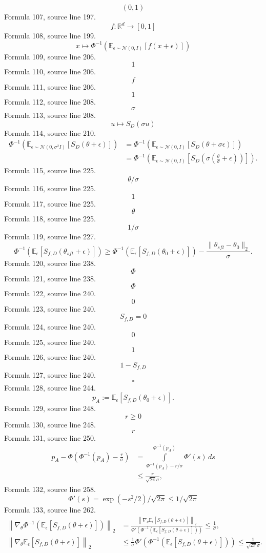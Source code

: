 \documentclass{ctexart}
\begin{document}
\[(0,1)\]
Formula 107, source line 197.
\[f:\mathbb R^d\to[0,1]\]
Formula 108, source line 199.
\[
x\longmapsto
\Phi^{-1}\left(
\mathbb E_{\epsilon\sim\mathcal N(0,I)}[f(x+\epsilon)]
\right)
\]
Formula 109, source line 206.
\[1\]
Formula 110, source line 206.
\[f\]
Formula 111, source line 206.
\[1\]
Formula 112, source line 208.
\[\sigma\]
Formula 113, source line 208.
\[u\mapsto S_D(\sigma u)\]
Formula 114, source line 210.
\[
\begin{aligned}
\Phi^{-1}\left(
\mathbb E_{\epsilon\sim\mathcal N(0,\sigma^2I)}[S_D(\theta+\epsilon)]
\right)
&=\Phi^{-1}\left(
\mathbb E_{\epsilon\sim\mathcal N(0,I)}[S_D(\theta+\sigma\epsilon)]
\right)\\
&=\Phi^{-1}\left(
\mathbb E_{\epsilon\sim\mathcal N(0,I)}
\left[S_D\left(\sigma\left(\frac{\theta}{\sigma}+\epsilon\right)\right)\right]
\right).
\end{aligned}
\]
Formula 115, source line 225.
\[\theta/\sigma\]
Formula 116, source line 225.
\[1\]
Formula 117, source line 225.
\[\theta\]
Formula 118, source line 225.
\[1/\sigma\]
Formula 119, source line 227.
\[
\Phi^{-1}\left(
\mathbb E_\epsilon[S_{f,D}(\theta_{sft}+\epsilon)]
\right)
\geq
\Phi^{-1}\left(
\mathbb E_\epsilon[S_{f,D}(\theta_0+\epsilon)]
\right)
-\frac{\|\theta_{sft}-\theta_0\|_2}{\sigma}.
\]
Formula 120, source line 238.
\[\Phi\]
Formula 121, source line 238.
\[\Phi\]
Formula 122, source line 240.
\[0\]
Formula 123, source line 240.
\[S_{f,D}=0\]
Formula 124, source line 240.
\[0\]
Formula 125, source line 240.
\[1\]
Formula 126, source line 240.
\[1-S_{f,D}\]
Formula 127, source line 240.
\[\square\]
Formula 128, source line 244.
\[
p_A:=\mathbb E_\epsilon[S_{f,D}(\theta_0+\epsilon)].
\]
Formula 129, source line 248.
\[r\geq0\]
Formula 130, source line 248.
\[r\]
Formula 131, source line 250.
\[
\begin{aligned}
p_A-\Phi\left(\Phi^{-1}(p_A)-\frac r\sigma\right)
&=\int\limits_{\Phi^{-1}(p_A)-r/\sigma}^{\Phi^{-1}(p_A)}\Phi'(s)\,ds\\
&\leq\frac{r}{\sqrt{2\pi}\sigma},
\end{aligned}
\]
Formula 132, source line 258.
\[\Phi'(s)=\exp(-s^2/2)/\sqrt{2\pi}\leq1/\sqrt{2\pi}\]
Formula 133, source line 262.
\[
\begin{aligned}
\left\|\nabla_\theta
\Phi^{-1}\left(\mathbb E_\epsilon[S_{f,D}(\theta+\epsilon)]\right)
\right\|_2
&=\frac{
\left\|\nabla_\theta\mathbb E_\epsilon[S_{f,D}(\theta+\epsilon)]\right\|_2
}{
\Phi'\left(\Phi^{-1}\left(\mathbb E_\epsilon[S_{f,D}(\theta+\epsilon)]\right)\right)
}
\leq\frac1\sigma,\\
\left\|\nabla_\theta\mathbb E_\epsilon[S_{f,D}(\theta+\epsilon)]\right\|_2
&\leq\frac1\sigma
\Phi'\left(\Phi^{-1}\left(\mathbb E_\epsilon[S_{f,D}(\theta+\epsilon)]\right)\right)
\leq\frac{1}{\sqrt{2\pi}\sigma}.
\end{aligned}
\]
\end{document}
